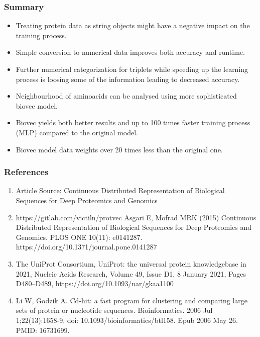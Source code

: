 \documentclass[10pt]{beamer}
\begin{document}
\begin{frame}
\frametitle{Summary}
\begin{itemize}
\item Treating protein data as string objects might have a negative impact on the training process.
\item Simple conversion to numerical data improves both accuracy  and runtime.
\item Further numerical categorization for triplets while speeding up the learning process is loosing some of the information leading to decreased accuracy.
\item Neighbourhood of aminoacids can be analysed using more sophisticated biovec model.
\item Biovec yields both better results and up to 100 times faster training process (MLP) compared to the original model.
\item Biovec model data weights over 20 times less than the original one.
\end{itemize}
\end{frame}

\begin{frame}
\frametitle{References}
\begin{footnotesize}
\begin{enumerate}
\item Article Source: Continuous Distributed Representation of Biological Sequences for Deep Proteomics and Genomics
\item https://gitlab.com/victiln/protvec
Asgari E, Mofrad MRK (2015) Continuous Distributed Representation of Biological Sequences for Deep Proteomics and Genomics. PLOS ONE 10(11): e0141287. https://doi.org/10.1371/journal.pone.0141287
\item The UniProt Consortium, UniProt: the universal protein knowledgebase in 2021, Nucleic Acids Research, Volume 49, Issue D1, 8 January 2021, Pages D480–D489, https://doi.org/10.1093/nar/gkaa1100
\item Li W, Godzik A. Cd-hit: a fast program for clustering and comparing large sets of protein or nucleotide sequences. Bioinformatics. 2006 Jul 1;22(13):1658-9. doi: 10.1093/bioinformatics/btl158. Epub 2006 May 26. PMID: 16731699.
\end{enumerate}
\end{footnotesize}
\end{frame}
\end{document}
